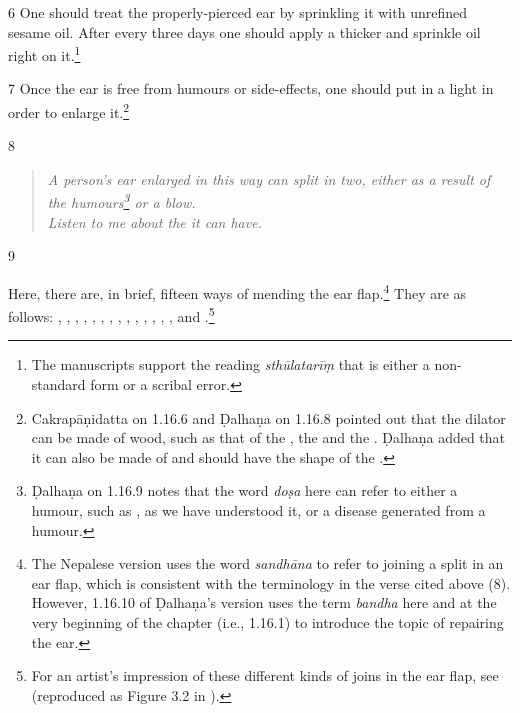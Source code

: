 \begin{translation}
    \item[6] One should treat the properly-pierced ear by sprinkling it with
unrefined sesame oil.   After every three days one should apply a thicker
 and sprinkle oil right on it.\footnote{The manuscripts
    support the reading \emph{sthūlatarīṃ} that is either a non-standard form or a
    scribal error.}
    
    \item[7]
    Once the ear is free from humours or side-effects, one should 
    put in a light  in order to enlarge 
    it.\footnote{Cakrapāṇidatta on 1.16.6 \citep[127]{acar-1939} and Ḍalhaṇa on 1.16.8 
    \citep[77]{vulgate} pointed out that the dilator can be made of wood, such as that of the 
    , the  and the 
    . Ḍalhaṇa added that it can also be made of  
    and should have the shape of the .}
    
    \item[8]
    
    \begin{quote}
        \itshape
A person's ear enlarged in this way can split in two, either as a result of the 
humours\footnote{Ḍalhaṇa on 1.16.9  \citep[77]{vulgate} notes that the word \emph{doṣa} 
here can refer to either a humour, such as , as we have understood it, or a 
disease generated from a humour.} or a blow.\\ Listen to me about the 
it can have. 
    \end{quote}
    
        \item[9]
    
Here, there are, in brief, fifteen ways of mending the ear flap.\footnote{The Nepalese version uses the word \emph{sandhāna} to refer to joining a split in an ear flap, which is consistent with the terminology in the verse cited above (8). However, 1.16.10 of Ḍalhaṇa's version \citep[77]{vulgate} uses the term \emph{bandha} here and at the very beginning of the chapter (i.e., 1.16.1) to introduce the topic of repairing the ear.}  They are as follows:
    , , , , , , , , , , 
    , ,
    , , and .\footnote{For an artist's impression of these different kinds of joins in the ear flap, see \cite[290]{majn-1975} (reproduced as Figure 3.2 in \cite[154]{wuja-2003}).}
    

\end{translation}
